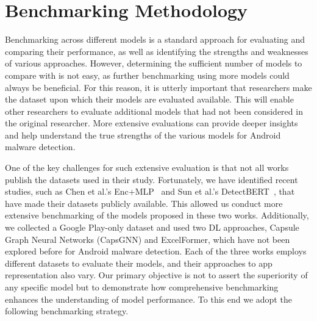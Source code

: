 \section{Benchmarking Methodology}
\label{sec:benchmark_method}

Benchmarking
across different models is a standard approach for evaluating and
comparing their performance, as well as identifying the strengths and
weaknesses of various approaches. However, determining the sufficient
number of models to compare with is not easy, as further benchmarking
using more models could always be beneficial. For this reason, it is
utterly important that researchers make the dataset upon which their
models are evaluated available. This will enable other researchers
to evaluate additional models that had not been considered in the original
researcher. More extensive
evaluations can provide deeper insights and help understand the true
strengths of the various models for Android malware detection.

One of the key challenges for such extensive evaluation is that not all works publish the datasets used in their study.  Fortunately, we
have identified recent studies, such as Chen et al.’s
Enc+MLP~\cite{Chen:USENIX23} and Sun et al.’s
DetectBERT~\cite{Sun:esem24}, that have made their datasets publicly
available. This allowed us conduct more extensive benchmarking of the models proposed
in these two works.  Additionally, we collected a Google Play-only dataset and used two DL approaches,
Capsule Graph Neural Networks (CapsGNN) and ExcelFormer, which have not been explored before for Android
malware detection.
Each of the three works employs different datasets to evaluate their models,
and their approaches to app representation also vary. 
Our primary objective is not to assert the
superiority of any specific model but to demonstrate how comprehensive
benchmarking enhances the understanding of model performance. To this end we adopt
the following benchmarking strategy.

